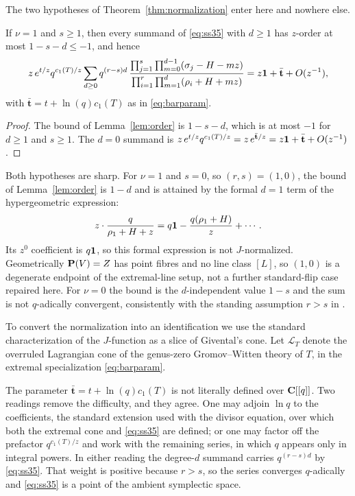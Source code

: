 The two hypotheses of Theorem~\ref{thm:normalization} enter here and nowhere
else.

\begin{corollary}
  \label{cor:normalized}
  If \(\nu=1\) and \(s\ge1\), then every summand of \eqref{eq:ss35} with
  \(d\ge1\) has \(z\)-order at most \(1-s-d\le-1\), and hence
  \[
    z\,e^{t/z}q^{c_{1}(T)/z}
    \sum_{d\ge0}q^{(r-s)d}\,
    \frac{\prod_{j=1}^{s}\prod_{m=0}^{d-1}(\sigma_{j}-H-mz)}
         {\prod_{i=1}^{r}\prod_{m=1}^{d}(\rho_{i}+H+mz)}
    =z\mathbf 1+\bar{\mathbf t}+O(z^{-1}),
  \]
  with \(\bar{\mathbf t}=t+\ln(q)c_{1}(T)\) as in \eqref{eq:barparam}.
\end{corollary}

\begin{proof}
  The bound of Lemma~\ref{lem:order} is \(1-s-d\), which is at most \(-1\)
  for \(d\ge1\) and \(s\ge1\).  The \(d=0\) summand is
  \(z\,e^{t/z}q^{c_{1}(T)/z}=z\,e^{\bar{\mathbf t}/z}
  =z\mathbf 1+\bar{\mathbf t}+O(z^{-1})\).
\end{proof}

\begin{remark}
  \label{rem:boundary}
  Both hypotheses are sharp.  For \(\nu=1\) and \(s=0\), so \((r,s)=(1,0)\),
  the bound of Lemma~\ref{lem:order} is \(1-d\) and is attained by the formal
  \(d=1\) term of the hypergeometric expression:
  \[
    z\cdot\frac{q}{\rho_{1}+H+z}
    =q\mathbf 1-\frac{q(\rho_{1}+H)}{z}+\cdots.
  \]
  Its \(z^{0}\) coefficient is \(q\mathbf 1\), so this formal expression is not
  \(J\)-normalized.  Geometrically \(\mathbf P(V)=Z\) has point fibres and no line
  class \([L]\), so \((1,0)\) is a degenerate endpoint of the extremal-line
  setup, not a further standard-flip case repaired here.  For \(\nu=0\) the bound is the
  \(d\)-independent value \(1-s\) and the sum is not \(q\)-adically
  convergent, consistently with the standing assumption \(r>s\) in \cite{SS}.
\end{remark}

To convert the normalization into an identification we use the standard
characterization of the \(J\)-function as a slice of Givental's cone.  Let
\(\mathcal L_{T}\) denote the overruled Lagrangian cone of the genus-zero
Gromov--Witten theory of \(T\), in the extremal specialization
\eqref{eq:barparam}.

The parameter \(\bar{\mathbf t}=t+\ln(q)c_{1}(T)\) is not literally defined
over \(\mathbf C[[q]]\).  Two readings remove the difficulty, and they agree.  One
may adjoin \(\ln q\) to the coefficients, the standard extension used with
the divisor equation, over which both the extremal cone and \eqref{eq:ss35}
are defined; or one may factor off the prefactor \(q^{c_{1}(T)/z}\) and work
with the remaining series, in which \(q\) appears only in integral powers.
In either reading the degree-\(d\) summand carries \(q^{(r-s)d}\) by
\eqref{eq:ss35}.  That weight is positive because \(r>s\), so the series
converges \(q\)-adically and \eqref{eq:ss35} is a point of the ambient
symplectic space.

